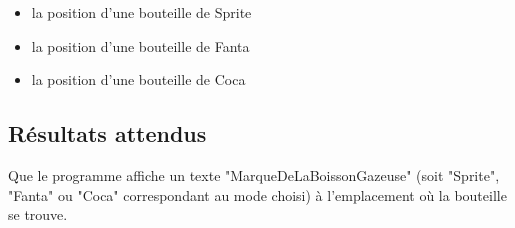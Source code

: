 \vspace{0.2cm}
\begin{itemize}
  \item la position d'une bouteille de Sprite
  \item la position d'une bouteille de Fanta
  \item la position d'une bouteille de Coca
\end{itemize}


\newpage
\subsection{Résultats attendus}
Que le programme affiche un texte "MarqueDeLaBoissonGazeuse" (soit "Sprite", "Fanta" ou "Coca" correspondant au mode choisi) à l'emplacement où la bouteille se trouve.

\vspace{0.2cm}
\noindent
\begin{minipage}[c]{\textwidth}
  \centering
  \\
  \label{fig.Bouteilles_Resultats}
\end{minipage}\\
